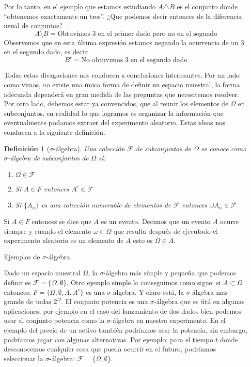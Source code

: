 \documentclass[14pt]{extreport}
\newtheorem{definition}{Definición}[chapter]
\newcounter{ejemplo}[chapter]
\begin{document}
Por lo tanto, en el ejemplo que estamos estudiando $A \triangle B$ es el conjunto donde ``obtenemos exactamente un tres''. ¿Que podemos decir entonces de la diferencia
usual de conjuntos? 
$$
A \setminus B = \text{Obtuvimos 3 en el primer dado pero no en el segundo}
$$
Observemos que en esta última expresión estamos negando la ocurrencia de un 3 en el segundo dado, es decir: 
$$
B^c = \text{No obtuvimos 3 en el segundo dado}
$$

Todas estas divagaciones nos conducen a conclusiones interesantes. Por un lado como vimos, no existe una única forma de definir un espacio muestral, la forma adecuada dependerá en gran medida de las preguntas que necesitemos resolver. Por otro lado, debemos estar ya convencidos, que al reunir los elementos de $\Omega$ en subconjuntos, en realidad lo que logramos es organizar la información que eventualmente podamos extraer del experimento aleatorio. Estas ideas nos conducen a la siguiente definición.
\begin{definition}[$\sigma$-álgebra]
Una colección $\mathcal{F}$ de subconjuntos de $\Omega$ se conoce como $\sigma$-álgebra de subconjuntos de $\Omega$ si:
\begin{enumerate}
	\item $\Omega \in \mathcal{F}$
	\item Si $A \in F$ entonces $A^c \in \mathcal{F}$
	\item Si $\{A_n\}$ es una colección numerable de elementos de $\mathcal{F}$ entonces $\cup A_n \in \mathcal{F}$
\end{enumerate}
\end{definition}

Si $A \in F$ entonces se dice que $A$ es un evento. Decimos que un evento $A$ ocurre siempre y cuando el elemento $\omega \in \Omega$ que resulta después de ejecutado el experimento aleatorio es un elemento de $A$ esto es $\Omega \in A$. 

Ejemplos de $\sigma$-álgebra. 

Dado un espacio muestral $\Omega$, la $\sigma$-álgebra más simple y pequeña que podemos definir es $\mathcal{F}=\{\Omega, \emptyset\}$. Otro ejemplo simple lo conseguimos como sigue: si $A \subset \Omega$ entonces: $F = \{\Omega,\emptyset, A, A^c\}$ es una $\sigma$-álgebra. Y claro está, la $\sigma$-álgebra mas grande de todas $2^\Omega$. El conjunto potencia es una $\sigma$-álgebra que es útil en algunas aplicaciones, por ejemplo en el caso del lanzamiento de dos dados bien podemos usar al conjunto potencia como la $\sigma$-álgebra en nuestro experimento. En el ejemplo del precio de un activo también podríamos usar la potencia, sin embargo, podríamos jugar con algunas alternativas. Por ejemplo; para el tiempo $t$ donde desconocemos cualquier cosa que pueda ocurrir en el futuro, podríamos seleccionar la $\sigma$-álgebra: $\mathcal{F} = \{\Omega,\emptyset\}$.
\end{document}
